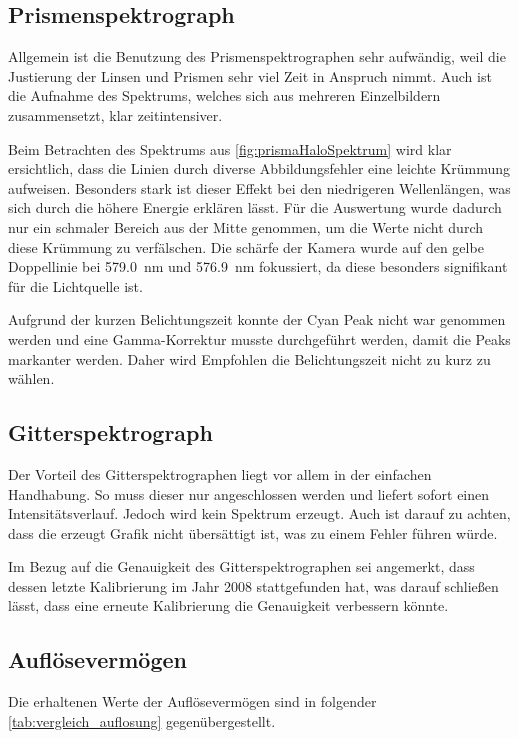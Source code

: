 \documentclass[12pt,english,ngerman]{scrartcl}
\begin{document}
\subsection{Prismenspektrograph}

Allgemein ist die Benutzung des Prismenspektrographen sehr aufwändig, weil die
Justierung der Linsen und Prismen sehr viel Zeit in Anspruch nimmt. Auch ist
die Aufnahme des Spektrums, welches sich aus mehreren Einzelbildern
zusammensetzt, klar zeitintensiver.

Beim Betrachten des Spektrums aus \autoref{fig:prismaHaloSpektrum} wird klar
ersichtlich, dass die Linien durch diverse Abbildungsfehler eine leichte
Krümmung aufweisen. Besonders stark ist dieser Effekt bei den niedrigeren
Wellenlängen, was sich durch die höhere Energie erklären lässt. Für die
Auswertung wurde dadurch nur ein schmaler Bereich aus der Mitte genommen, um
die Werte nicht durch diese Krümmung zu verfälschen. Die schärfe der Kamera
wurde auf den gelbe Doppellinie bei \SI{579.0}{\nano\meter} und
\SI{576.9}{\nano\meter} fokussiert, da diese besonders signifikant für die
Lichtquelle ist.

Aufgrund der kurzen Belichtungszeit konnte der Cyan Peak nicht war genommen
werden und eine Gamma-Korrektur musste durchgeführt werden, damit die Peaks
markanter werden. Daher wird Empfohlen die Belichtungszeit nicht zu kurz zu
wählen.

\subsection{Gitterspektrograph}

Der Vorteil des Gitterspektrographen liegt vor allem in der einfachen
Handhabung. So muss dieser nur angeschlossen werden und liefert sofort einen
Intensitätsverlauf. Jedoch wird kein Spektrum erzeugt. Auch ist darauf zu
achten, dass die erzeugt Grafik nicht übersättigt ist, was zu einem Fehler
führen würde.

Im Bezug auf die Genauigkeit des Gitterspektrographen sei angemerkt, dass
dessen letzte Kalibrierung im Jahr 2008 stattgefunden hat, was darauf schließen
lässt, dass eine erneute Kalibrierung die Genauigkeit verbessern könnte.

\subsection{Auflösevermögen}
Die erhaltenen Werte der Auflösevermögen sind in folgender
\autoref{tab:vergleich_auflosung} gegenübergestellt.
\end{document}

